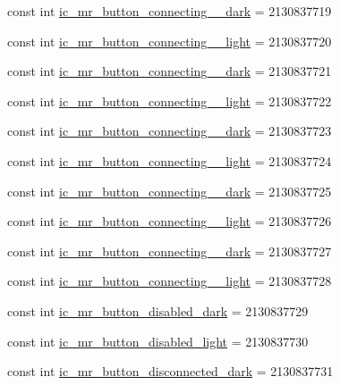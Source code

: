 \begin{CompactItemize}
\item 
const int \hyperlink{class__2doo_1_1_droid_1_1_resource_1_1_drawable_f15d0da9b39cba24e32a3cfe9cf8d31e}{ic\_\-mr\_\-button\_\-connecting\_\_\-dark} = 2130837719
\item 
const int \hyperlink{class__2doo_1_1_droid_1_1_resource_1_1_drawable_7724fb24d33619d97471fd2b450c62a9}{ic\_\-mr\_\-button\_\-connecting\_\_\-light} = 2130837720
\item 
const int \hyperlink{class__2doo_1_1_droid_1_1_resource_1_1_drawable_7a6fcf2282cec42beed3ff4b5741597b}{ic\_\-mr\_\-button\_\-connecting\_\_\-dark} = 2130837721
\item 
const int \hyperlink{class__2doo_1_1_droid_1_1_resource_1_1_drawable_d842c6ce6512b7ba6c9e29dc8cae5d38}{ic\_\-mr\_\-button\_\-connecting\_\_\-light} = 2130837722
\item 
const int \hyperlink{class__2doo_1_1_droid_1_1_resource_1_1_drawable_b13c2cc80ee92338bc9db2acd6976b7a}{ic\_\-mr\_\-button\_\-connecting\_\_\-dark} = 2130837723
\item 
const int \hyperlink{class__2doo_1_1_droid_1_1_resource_1_1_drawable_530d060b8c2c4372ebc00064e9a0277d}{ic\_\-mr\_\-button\_\-connecting\_\_\-light} = 2130837724
\item 
const int \hyperlink{class__2doo_1_1_droid_1_1_resource_1_1_drawable_982e22922db25c12ffa381b3c6768ee7}{ic\_\-mr\_\-button\_\-connecting\_\_\-dark} = 2130837725
\item 
const int \hyperlink{class__2doo_1_1_droid_1_1_resource_1_1_drawable_21a0048e0053ac60a2adbd834a658834}{ic\_\-mr\_\-button\_\-connecting\_\_\-light} = 2130837726
\item 
const int \hyperlink{class__2doo_1_1_droid_1_1_resource_1_1_drawable_c1598bc6a39e53aa7eac4d49904dd366}{ic\_\-mr\_\-button\_\-connecting\_\_\-dark} = 2130837727
\item 
const int \hyperlink{class__2doo_1_1_droid_1_1_resource_1_1_drawable_f968067e007ef8f504b86de33d28f0c7}{ic\_\-mr\_\-button\_\-connecting\_\_\-light} = 2130837728
\item 
const int \hyperlink{class__2doo_1_1_droid_1_1_resource_1_1_drawable_248ea394b6c09ef2314436a3c4a36791}{ic\_\-mr\_\-button\_\-disabled\_\-dark} = 2130837729
\item 
const int \hyperlink{class__2doo_1_1_droid_1_1_resource_1_1_drawable_6e09aa0fb306259e11c6b7faa88939c1}{ic\_\-mr\_\-button\_\-disabled\_\-light} = 2130837730
\item 
const int \hyperlink{class__2doo_1_1_droid_1_1_resource_1_1_drawable_11fe7e7b0fb6a179320df30d1ad74071}{ic\_\-mr\_\-button\_\-disconnected\_\-dark} = 2130837731

\end{CompactItemize}
